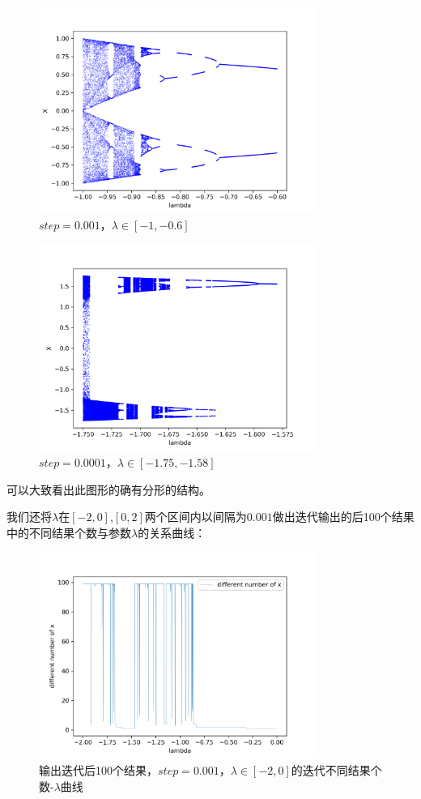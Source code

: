 \documentclass[a4paper,11pt]{article}
\begin{document}
\begin{figure}[!htbp]        
\centering
\includegraphics[bb= 0 0 450 370,width=9cm]{s=0.001-2-2.png}      
\caption{ $step = 0.001$，$\lambda \in [-1,-0.6]$}      
\end{figure}


\begin{figure}[!htbp]        
\centering
\includegraphics[bb= 0 0 450 370,width=9cm]{s=0.00001.png}      
\caption{ $step = 0.0001$，$\lambda \in [-1.75,-1.58]$}      
\end{figure}

\newpage
可以大致看出此图形的确有分形的结构。

我们还将$\lambda$在$[-2,0]$,$[0,2]$两个区间内以间隔为$0.001$做出迭代输出的后100个结果中的不同结果个数与参数$\lambda$的关系曲线：

\begin{figure}[!htbp]        
\centering
\includegraphics[bb= 0 0 450 370,width=9cm]{s=0.001-2-1.png}      
\caption{ 输出迭代后100个结果，$step = 0.001$，$\lambda \in [-2,0]$的迭代不同结果个数-$\lambda$曲线}      
\end{figure}
\end{document}
